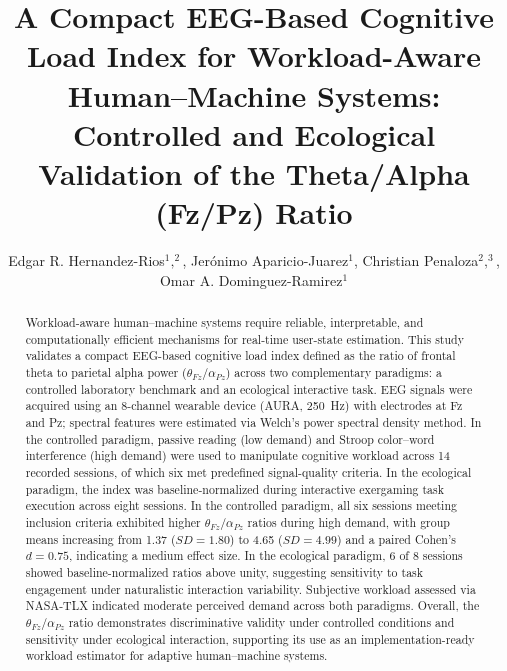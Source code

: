 \documentclass[10pt]{iopart}
\begin{document}
\title[A Compact EEG-Based Cognitive Load Index for HMI]
{A Compact EEG-Based Cognitive Load Index for Workload-Aware Human--Machine Systems: Controlled and Ecological Validation of the Theta/Alpha (Fz/Pz) Ratio}

\author{Edgar R. Hernandez-Rios$^1$$,^2$, 
Jerónimo Aparicio-Juarez$^1$, 
Christian Penaloza$^2$$,^3$,
Omar A. Dominguez-Ramirez$^1$}

\address{$^1$ Universidad Autonoma del Estado de Hidalgo (UAEH), Pachuca, Mexico}
\address{$^2$ Mirai Innovation Research Institute, Osaka, Japan}
\address{$^3$ Universidad Autonoma de Chihuahua (UACH), Chihuahua, Mexico}


\begin{abstract}
Workload-aware human--machine systems require reliable,
interpretable, and computationally efficient mechanisms for
real-time user-state estimation. This study validates a compact
EEG-based cognitive load index defined as the ratio of frontal
theta to parietal alpha power ($\theta_{Fz}/\alpha_{Pz}$) across
two complementary paradigms: a controlled laboratory benchmark
and an ecological interactive task. EEG signals were acquired
using an 8-channel wearable device (AURA, 250~Hz) with electrodes
at Fz and Pz; spectral features were estimated via Welch's power
spectral density method. In the controlled paradigm, passive
reading (low demand) and Stroop color--word interference (high
demand) were used to manipulate cognitive workload across 14
recorded sessions, of which six met predefined
signal-quality criteria. In the ecological paradigm, the index
was baseline-normalized during interactive exergaming task
execution across eight sessions. In the controlled paradigm, all
six sessions meeting inclusion criteria exhibited higher
$\theta_{Fz}/\alpha_{Pz}$ ratios during high demand, with group
means increasing from 1.37 ($SD = 1.80$) to 4.65 ($SD = 4.99$)
and a paired Cohen's $d = 0.75$, indicating a medium effect size.
In the ecological paradigm, 6 of 8 sessions showed
baseline-normalized ratios above unity, suggesting sensitivity to
task engagement under naturalistic interaction variability.
Subjective workload assessed via NASA-TLX indicated moderate
perceived demand across both paradigms. Overall, the
$\theta_{Fz}/\alpha_{Pz}$ ratio demonstrates discriminative
validity under controlled conditions and sensitivity under
ecological interaction, supporting its use as an
implementation-ready workload estimator for adaptive human--machine
systems.
\end{abstract}
\end{document}
